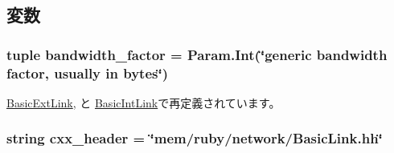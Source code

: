 \subsection{変数}
\hypertarget{classBasicLink_1_1BasicLink_ac591437927b62e1825866e5357208d37}{
\subsubsection[{bandwidth\_\-factor}]{\setlength{\rightskip}{0pt plus 5cm}tuple {\bf bandwidth\_\-factor} = Param.Int(\char`\"{}generic bandwidth factor, usually in bytes\char`\"{})}}
\label{classBasicLink_1_1BasicLink_ac591437927b62e1825866e5357208d37}


\hyperlink{classBasicLink_1_1BasicExtLink_affbbb1b5f39453ff2abf6f5ae9385606}{BasicExtLink}, と \hyperlink{classBasicLink_1_1BasicIntLink_affbbb1b5f39453ff2abf6f5ae9385606}{BasicIntLink}で再定義されています。\hypertarget{classBasicLink_1_1BasicLink_a17da7064bc5c518791f0c891eff05fda}{
\subsubsection[{cxx\_\-header}]{\setlength{\rightskip}{0pt plus 5cm}string {\bf cxx\_\-header} = \char`\"{}mem/ruby/network/BasicLink.hh\char`\"{}}}
\label{classBasicLink_1_1BasicLink_a17da7064bc5c518791f0c891eff05fda}


